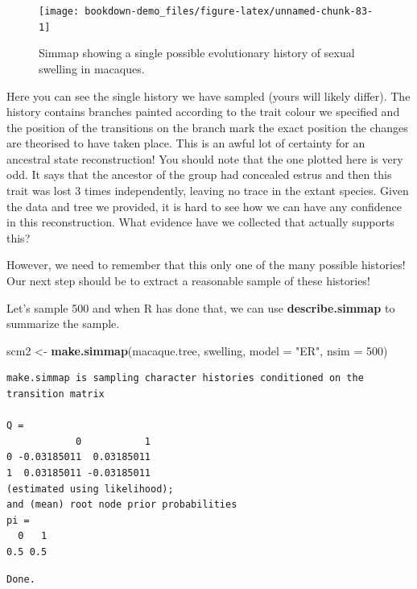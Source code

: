 \documentclass[
]{book}
\newenvironment{Shaded}{\begin{snugshade}}{\end{snugshade}}
\newcommand{\DataTypeTok}[1]{\textcolor[rgb]{0.13,0.29,0.53}{#1}}
\newcommand{\DecValTok}[1]{\textcolor[rgb]{0.00,0.00,0.81}{#1}}
\newcommand{\KeywordTok}[1]{\textcolor[rgb]{0.13,0.29,0.53}{\textbf{#1}}}
\newcommand{\NormalTok}[1]{#1}
\newcommand{\StringTok}[1]{\textcolor[rgb]{0.31,0.60,0.02}{#1}}
\begin{document}
\begin{figure}[H]

{\centering \texttt{[image: bookdown-demo\_files/figure-latex/unnamed-chunk-83-1]} 

}

\caption{Simmap showing a single possible evolutionary history of sexual swelling in macaques.}\label{fig:unnamed-chunk-83}
\end{figure}

Here you can see the single history we have sampled (yours will likely differ). The history contains branches painted according to the trait colour we specified and the position of the transitions on the branch mark the exact position the changes are theorised to have taken place. This is an awful lot of certainty for an ancestral state reconstruction! You should note that the one plotted here is very odd. It says that the ancestor of the group had concealed estrus and then this trait was lost 3 times independently, leaving no trace in the extant species. Given the data and tree we provided, it is hard to see how we can have any confidence in this reconstruction. What evidence have we collected that actually supports this?

However, we need to remember that this only one of the many possible histories! Our next step should be to extract a reasonable sample of these histories!

Let's sample 500 and when R has done that, we can use \textbf{describe.simmap} to summarize the sample.

\begin{Shaded}
\begin{Highlighting}[]
\NormalTok{scm2 \textless{}{-}}\StringTok{ }\KeywordTok{make.simmap}\NormalTok{(macaque.tree, swelling, }\DataTypeTok{model =} \StringTok{"ER"}\NormalTok{, }\DataTypeTok{nsim =} \DecValTok{500}\NormalTok{)}
\end{Highlighting}
\end{Shaded}

\begin{verbatim}
make.simmap is sampling character histories conditioned on the transition matrix

Q =
            0           1
0 -0.03185011  0.03185011
1  0.03185011 -0.03185011
(estimated using likelihood);
and (mean) root node prior probabilities
pi =
  0   1 
0.5 0.5 
\end{verbatim}

\begin{verbatim}
Done.
\end{verbatim}
\end{document}
